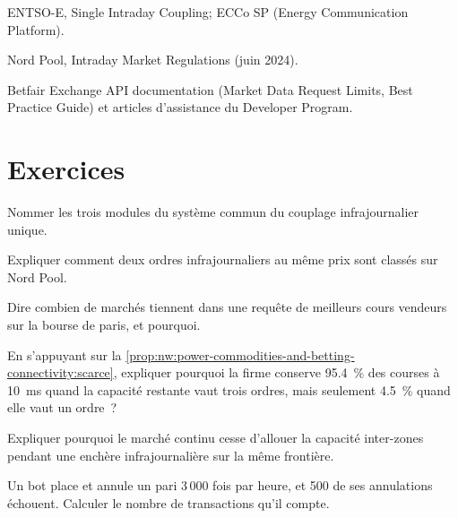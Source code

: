 \begin{omsources}
\item ENTSO-E, Single Intraday Coupling; ECCo SP (Energy Communication Platform).
\item Nord Pool, Intraday Market Regulations (juin 2024).
\item Betfair Exchange API documentation (Market Data Request Limits, Best Practice Guide) et articles d'assistance du Developer Program.
\end{omsources}

\section{Exercices}

\begin{exercise}[$\star$]\label{exo:nw:power-commodities-and-betting-connectivity:1}
Nommer les trois modules du système commun du couplage infrajournalier unique.
\end{exercise}

\begin{exercise}[$\star$]\label{exo:nw:power-commodities-and-betting-connectivity:2}
Expliquer comment deux ordres infrajournaliers au même prix sont classés sur Nord Pool.
\end{exercise}

\begin{exercise}[$\star$]\label{exo:nw:power-commodities-and-betting-connectivity:3}
Dire combien de marchés tiennent dans une requête de meilleurs cours vendeurs sur la bourse de paris, et pourquoi.
\end{exercise}

\begin{exercise}[$\star\star$]\label{exo:nw:power-commodities-and-betting-connectivity:4}
En s'appuyant sur la \cref{prop:nw:power-commodities-and-betting-connectivity:scarce}, expliquer pourquoi la firme conserve 95.4~\% des courses à
\qty{10}{\milli\second} quand la capacité restante vaut trois ordres, mais seulement 4.5~\% quand elle vaut un ordre~?
\end{exercise}

\begin{exercise}[$\star\star$]\label{exo:nw:power-commodities-and-betting-connectivity:5}
Expliquer pourquoi le marché continu cesse d'allouer la capacité inter-zones pendant une enchère infrajournalière sur la même frontière.
\end{exercise}

\begin{exercise}[$\star\star$]\label{exo:nw:power-commodities-and-betting-connectivity:6}
Un bot place et annule un pari 3\,000 fois par heure, et 500 de ses annulations échouent. Calculer le nombre de transactions qu'il compte.
\end{exercise}

